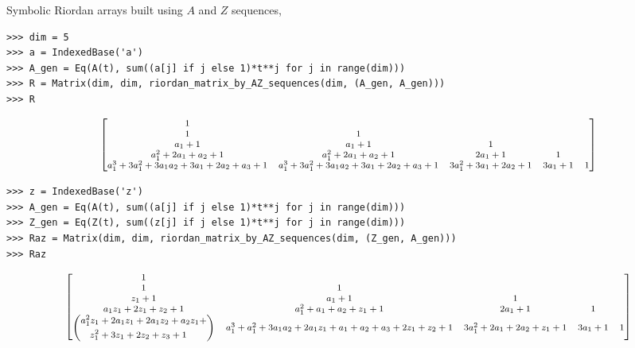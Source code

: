 \begin{example}
Symbolic Riordan arrays built using $A$ and $Z$ sequences,
\begin{verbatim}
>>> dim = 5
>>> a = IndexedBase('a')
>>> A_gen = Eq(A(t), sum((a[j] if j else 1)*t**j for j in range(dim)))
>>> R = Matrix(dim, dim, riordan_matrix_by_AZ_sequences(dim, (A_gen, A_gen)))
>>> R
\end{verbatim}
\begin{displaymath}
\footnotesize
\left[\begin{matrix}1 &   &   &   &  \\1 & 1 &   &   &  \\a_{1} + 1 & a_{1} + 1 & 1 &   &  \\a_{1}^{2} + 2 a_{1} + a_{2} + 1 & a_{1}^{2} + 2 a_{1} + a_{2} + 1 & 2 a_{1} + 1 & 1 &  \\a_{1}^{3} + 3 a_{1}^{2} + 3 a_{1} a_{2} + 3 a_{1} + 2 a_{2} + a_{3} + 1 & a_{1}^{3} + 3 a_{1}^{2} + 3 a_{1} a_{2} + 3 a_{1} + 2 a_{2} + a_{3} + 1 & 3 a_{1}^{2} + 3 a_{1} + 2 a_{2} + 1 & 3 a_{1} + 1 & 1\end{matrix}\right]
\end{displaymath}
\begin{verbatim}
>>> z = IndexedBase('z')
>>> A_gen = Eq(A(t), sum((a[j] if j else 1)*t**j for j in range(dim)))
>>> Z_gen = Eq(Z(t), sum((z[j] if j else 1)*t**j for j in range(dim)))
>>> Raz = Matrix(dim, dim, riordan_matrix_by_AZ_sequences(dim, (Z_gen, A_gen)))
>>> Raz
\end{verbatim}
\begin{displaymath}
\footnotesize
\left[\begin{matrix}1 &   &   &   &  \\1 & 1 &   &   &  \\z_{1} + 1 & a_{1} + 1 & 1 &   &  \\a_{1} z_{1} + 2 z_{1} + z_{2} + 1 & a_{1}^{2} + a_{1} + a_{2} + z_{1} + 1 & 2 a_{1} + 1 & 1 &  \\ \left(\begin{split} a_{1}^{2} z_{1} &+ 2 a_{1} z_{1} + 2 a_{1} z_{2} + a_{2} z_{1} +\\ z_{1}^{2} &+ 3 z_{1} + 2 z_{2} + z_{3} + 1\end{split}\right) & a_{1}^{3} + a_{1}^{2} + 3 a_{1} a_{2} + 2 a_{1} z_{1} + a_{1} + a_{2} + a_{3} + 2 z_{1} + z_{2} + 1 & 3 a_{1}^{2} + 2 a_{1} + 2 a_{2} + z_{1} + 1 & 3 a_{1} + 1 & 1\end{matrix}\right]
\end{displaymath}

\end{example}

